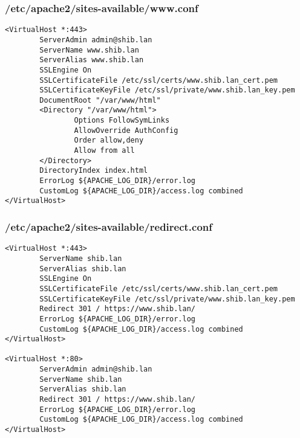 \subsubsection{/etc/apache2/sites-available/www.conf}
\begin{lstlisting}
<VirtualHost *:443>
        ServerAdmin admin@shib.lan
        ServerName www.shib.lan
        ServerAlias www.shib.lan
        SSLEngine On
        SSLCertificateFile /etc/ssl/certs/www.shib.lan_cert.pem
        SSLCertificateKeyFile /etc/ssl/private/www.shib.lan_key.pem
        DocumentRoot "/var/www/html"
        <Directory "/var/www/html">
                Options FollowSymLinks
                AllowOverride AuthConfig
                Order allow,deny
                Allow from all
        </Directory>
        DirectoryIndex index.html
        ErrorLog ${APACHE_LOG_DIR}/error.log
        CustomLog ${APACHE_LOG_DIR}/access.log combined
</VirtualHost>
\end{lstlisting}

\subsubsection{/etc/apache2/sites-available/redirect.conf}
\begin{lstlisting}
<VirtualHost *:443>
        ServerName shib.lan
        ServerAlias shib.lan
        SSLEngine On
        SSLCertificateFile /etc/ssl/certs/www.shib.lan_cert.pem
        SSLCertificateKeyFile /etc/ssl/private/www.shib.lan_key.pem
        Redirect 301 / https://www.shib.lan/
        ErrorLog ${APACHE_LOG_DIR}/error.log
        CustomLog ${APACHE_LOG_DIR}/access.log combined
</VirtualHost>

<VirtualHost *:80>
        ServerAdmin admin@shib.lan
        ServerName shib.lan
        ServerAlias shib.lan
        Redirect 301 / https://www.shib.lan/
        ErrorLog ${APACHE_LOG_DIR}/error.log
        CustomLog ${APACHE_LOG_DIR}/access.log combined
</VirtualHost>
\end{lstlisting}

